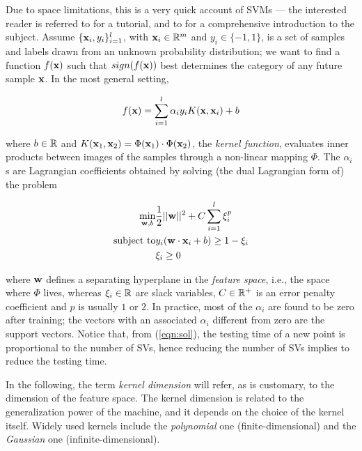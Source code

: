 Due to space limitations, this is a very quick account of SVMs --- the
interested reader is referred to \cite{Burges98} for a tutorial, and
to \cite{Cristianini00} for a comprehensive introduction to the
subject. Assume $\{\mathbf{x}_i,y_i\}_{i=1}^l$, with $\mathbf{x}_i \in \mathbb{R}^m$ and
$y_i \in \{-1,1\}$, is a set of samples and labels drawn from an
unknown probability distribution; we want to find a function $f(\mathbf{x})$
such that $sign(f(\mathbf{x}))$ best determines the category of any future
sample $\mathbf{x}$. In the most general setting,

\begin{equation} \label{eqn:sol}
  f(\mathbf{x}) = \sum_{i=1}^l \alpha_i y_i K(\mathbf{x},\mathbf{x}_i) + b
\end{equation}

\noindent where $b \in \mathbb{R}$ and $K(\mathbf{x}_1,\mathbf{x}_2) = \Phi(\mathbf{x}_1)
\cdot \Phi(\mathbf{x}_2)$, the \emph{kernel function}, evaluates inner
products between images of the samples through a non-linear mapping
$\Phi$. The $\alpha_i$s are Lagrangian coefficients obtained by
solving (the dual Lagrangian form of) the problem

\begin{eqnarray} \label{eqn:svm_primal}
  \min_{\mathbf{w},b}      & \frac{1}{2} ||\mathbf{w}||^2 + C \sum_{i=1}^l \xi_i^p \\
  \mbox{subject to} & y_i (\mathbf{w}\cdot\mathbf{x}_i + b) \geq 1-\xi_i            \nonumber \\
                    & \xi_i \geq 0                                    \nonumber
\end{eqnarray}

\noindent where $\mathbf{w}$ defines a separating hyperplane
in the \emph{feature space}, i.e., the space where $\Phi$ lives, whereas
$\xi_i \in \mathbb{R}$ are slack variables, $C \in \mathbb{R}^+$ is an error penalty
coefficient and $p$ is usually $1$ or $2$. In practice, most of the
$\alpha_i$ are found to be zero after training; the vectors with an
associated $\alpha_i$ different from zero are the support
vectors. Notice that, from (\ref{eqn:sol}), the testing time of a new point is
proportional to the number of SVs, hence reducing the number of SVs
implies to reduce the testing time.

In the following, the term \emph{kernel dimension} will refer, as is
customary, to the dimension of the feature space. The kernel dimension
is related to the generalization power of the machine, and it depends
on the choice of the kernel itself. Widely used kernels include the
\emph{polynomial} one (finite-dimensional) and the \emph{Gaussian} one
(infinite-dimensional).
